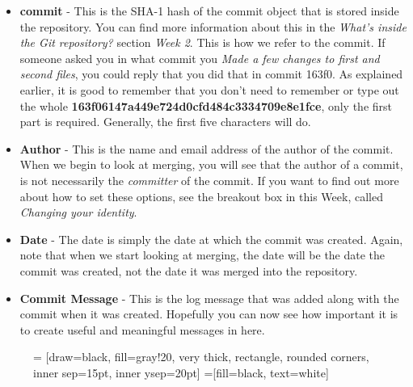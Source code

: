\begin{itemize}
\item \textbf{commit} - This is the SHA-1 hash of the commit object that is stored inside the repository.  You can find more information about this in the \emph{What's inside the Git repository?} section \emph{Week 2}.  This is how we refer to the commit.  If someone asked you in what commit you \emph{Made a few changes to first and second files}, you could reply that you did that in commit 163f0.  As explained earlier, it is good to remember that you don't need to remember or type out the whole \textbf{163f06147a449e724d0cfd484c3334709e8e1fce}, only the first part is required.  Generally, the first five characters will do.
\item \textbf{Author} - This is the name and email address of the author of the commit.  When we begin to look at merging, you will see that the author of a commit, is not necessarily the \emph{committer} of the commit.  If you want to find out more about how to set these options, see the breakout box in this Week, called \emph{Changing your identity}.
\item \textbf{Date} - The date is simply the date at which the commit was created.  Again, note that when we start looking at merging, the date will be the date the commit was created, not the date it was merged into the repository.
\item \textbf{Commit Message} - This is the log message that was added along with the commit when it was created.  Hopefully you can now see how important it is to create useful and meaningful messages in here.
\end{itemize}

\begin{figure}[hbt]
 = [draw=black, fill=gray!20, very thick, rectangle, rounded corners, inner sep=15pt, inner ysep=20pt]
 =[fill=black, text=white]
\end{figure}

